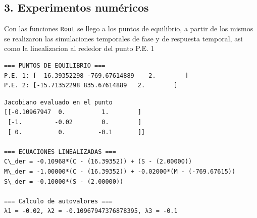 \documentclass[11pt]{article}
\begin{document}
    \subsection{3. Experimentos numéricos}\label{experimentos-numuxe9ricos}

Con las funciones \texttt{Root} se llego a los puntos de equilibrio, a
partir de los mismos se realizaron las simulaciones temporales de fase y
de respuesta temporal, asi como la linealizacion al rededor del punto
P.E. 1

    \begin{Verbatim}[commandchars=\\\{\}]
=== PUNTOS DE EQUILIBRIO ===
P.E. 1: [  16.39352298 -769.67614889    2.        ]
P.E. 2: [-15.71352298 835.67614889   2.        ]
    \end{Verbatim}

    \begin{Verbatim}[commandchars=\\\{\}]
Jacobiano evaluado en el punto
[[-0.10967947  0.          1.        ]
 [-1.         -0.02        0.        ]
 [ 0.          0.         -0.1       ]]

=== ECUACIONES LINEALIZADAS ===
C\_der = -0.10968*(C - (16.39352)) + (S - (2.00000))
M\_der = -1.00000*(C - (16.39352)) + -0.02000*(M - (-769.67615))
S\_der = -0.10000*(S - (2.00000))

=== Calculo de autovalores ===
λ1 = -0.02, λ2 = -0.10967947376878395, λ3 = -0.1
    \end{Verbatim}

    \begin{center}
    \end{center}
    { \hspace*{\fill} \\}
    
    \begin{center}
    \end{center}
    { \hspace*{\fill} \\}
    
    \begin{center}
    \end{center}
    { \hspace*{\fill} \\}
    
\end{document}
